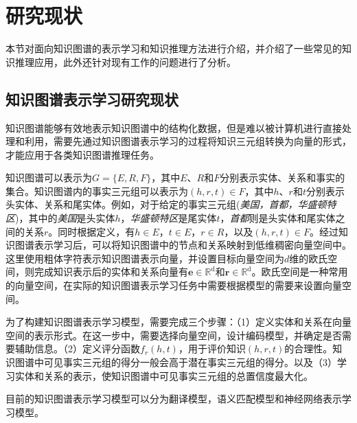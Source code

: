 \documentclass[algorithmlist, AutoFakeBold, AutoFakeSlant, figurelist, tablelist, nomlist, engineering, openany]{seuthesix} %
\begin{document}
\section{研究现状}
本节对面向知识图谱的表示学习和知识推理方法进行介绍，并介绍了一些常见的知识推理应用，此外还针对现有工作的问题进行了分析。

\subsection{知识图谱表示学习研究现状}
知识图谱能够有效地表示知识图谱中的结构化数据，但是难以被计算机进行直接处理和利用，需要先通过知识图谱表示学习的过程将知识三元组转换为向量的形式，才能应用于各类知识图谱推理任务。

知识图谱可以表示为$G=\{E, R, F\}$，其中$E$、$R$和$F$分别表示实体、关系和事实的集合。知识图谱内的事实三元组可以表示为$(h, r, t) \in F$，其中$h$、$r$和$t$分别表示头实体、关系和尾实体。例如，对于给定的事实三元组(\textit{美国，首都，华盛顿特区})，其中的\textit{美国}是头实体$h$，\textit{华盛顿特区}是尾实体$t$，\textit{首都}则是头实体和尾实体之间的关系$r$。同时根据定义，有$h \in E$，$t \in E$，$r \in R$，以及$(h, r, t) \in F$。经过知识图谱表示学习后，可以将知识图谱中的节点和关系映射到低维稠密向量空间中。
这里使用粗体字符表示知识图谱表示向量，并设置目标向量空间为$d$维的欧氏空间，则完成知识表示后的实体和关系向量有$\bm{e} \in \mathbb{R}^{\mathrm{d}}$和$\bm{r} \in \mathbb{R}^{\mathrm{d}}$。欧氏空间是一种常用的向量空间，在实际的知识图谱表示学习任务中需要根据模型的需要来设置向量空间。

为了构建知识图谱表示学习模型，需要完成三个步骤：（1）定义实体和关系在向量空间的表示形式。在这一步中，需要选择向量空间，设计编码模型，并确定是否需要辅助信息。（2）定义评分函数$f_r(h, t)$，用于评价知识$(h, r, t)$的合理性。知识图谱中可见事实三元组的得分一般会高于潜在事实三元组的得分。以及（3）学习实体和关系的表示，使知识图谱中可见事实三元组的总置信度最大化。

目前的知识图谱表示学习模型可以分为翻译模型，语义匹配模型和神经网络表示学习模型。


\end{document}
